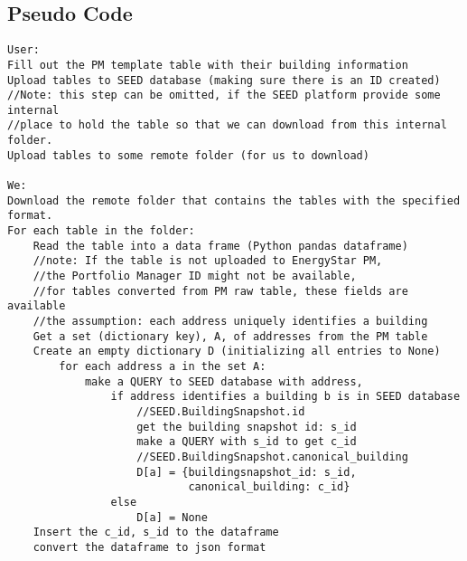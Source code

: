 \documentclass[12pt]{article}
\begin{document}
\subsection{Pseudo Code}
\makeatletter
\def\verbatim@font{\linespread{1}\small\ttfamily}
\begin{verbatim}
User:
Fill out the PM template table with their building information
Upload tables to SEED database (making sure there is an ID created)
//Note: this step can be omitted, if the SEED platform provide some internal 
//place to hold the table so that we can download from this internal folder.
Upload tables to some remote folder (for us to download)

We:
Download the remote folder that contains the tables with the specified format.
For each table in the folder:
    Read the table into a data frame (Python pandas dataframe)
    //note: If the table is not uploaded to EnergyStar PM, 
    //the Portfolio Manager ID might not be available,
    //for tables converted from PM raw table, these fields are available
    //the assumption: each address uniquely identifies a building
    Get a set (dictionary key), A, of addresses from the PM table
    Create an empty dictionary D (initializing all entries to None)
        for each address a in the set A:
            make a QUERY to SEED database with address, 
                if address identifies a building b is in SEED database
                    //SEED.BuildingSnapshot.id
                    get the building snapshot id: s_id
                    make a QUERY with s_id to get c_id
                    //SEED.BuildingSnapshot.canonical_building
                    D[a] = {buildingsnapshot_id: s_id,
                            canonical_building: c_id}
                else 
                    D[a] = None
    Insert the c_id, s_id to the dataframe
    convert the dataframe to json format
\end{verbatim}
\end{document}
